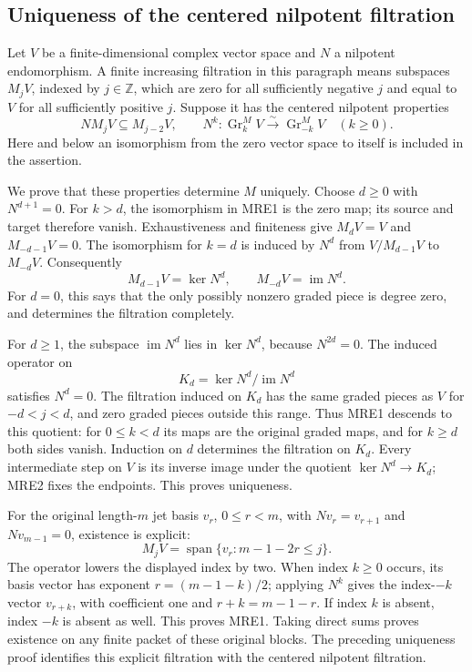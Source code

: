 \documentclass[11pt,a4paper]{article}
\begin{document}
\subsection{Uniqueness of the centered nilpotent filtration}

Let \(V\) be a finite-dimensional complex vector space and \(N\) a nilpotent
endomorphism. A finite increasing filtration in this paragraph means
subspaces \(M_jV\), indexed by \(j\in\mathbb Z\), which are zero for all
sufficiently negative \(j\) and equal to \(V\) for all sufficiently positive
\(j\). Suppose it has the centered nilpotent properties
\[
 NM_jV\subseteq M_{j-2}V,\qquad
 N^k:\operatorname{Gr}_k^M V\xrightarrow{\sim}
                    \operatorname{Gr}_{-k}^M V\quad(k\geq0).
 \tag{MRE1}
\]
Here and below an isomorphism from the zero vector space to itself is
included in the assertion.

We prove that these properties determine \(M\) uniquely. Choose \(d\geq0\)
with \(N^{d+1}=0\). For \(k>d\), the isomorphism in MRE1 is the zero map;
its source and target therefore vanish. Exhaustiveness and finiteness give
\(M_dV=V\) and \(M_{-d-1}V=0\). The isomorphism for \(k=d\) is induced by
\(N^d\) from \(V/M_{d-1}V\) to \(M_{-d}V\). Consequently
\[
 M_{d-1}V=\ker N^d,\qquad M_{-d}V=\operatorname{im}N^d.
 \tag{MRE2}
\]
For \(d=0\), this says that the only possibly nonzero graded piece is
degree zero, and determines the filtration completely.

For \(d\geq1\), the subspace \(\operatorname{im}N^d\) lies in
\(\ker N^d\), because \(N^{2d}=0\). The induced operator on
\[
 K_d=\ker N^d/\operatorname{im}N^d
 \tag{MRE3}
\]
satisfies \(N^d=0\). The filtration induced on \(K_d\) has the same graded
pieces as \(V\) for \(-d<j<d\), and zero graded pieces outside this range.
Thus MRE1 descends to this quotient: for \(0\leq k<d\) its maps are the
original graded maps, and for \(k\geq d\) both sides vanish. Induction on
\(d\) determines the filtration on \(K_d\). Every intermediate step on
\(V\) is its inverse image under the quotient
\(\ker N^d\longrightarrow K_d\); MRE2 fixes the endpoints. This proves
uniqueness.

For the original length-\(m\) jet basis \(v_r\), \(0\leq r<m\), with
\(Nv_r=v_{r+1}\) and \(Nv_{m-1}=0\), existence is explicit:
\[
 M_jV=\operatorname{span}\{v_r:m-1-2r\leq j\}.
 \tag{MRE4}
\]
The operator lowers the displayed index by two. When index \(k\geq0\)
occurs, its basis vector has exponent \(r=(m-1-k)/2\); applying \(N^k\)
gives the index-\(-k\) vector \(v_{r+k}\), with coefficient one and
\(r+k=m-1-r\). If index \(k\) is absent, index \(-k\) is absent as well.
This proves MRE1. Taking direct sums proves existence on any finite packet
of these original blocks. The preceding uniqueness proof identifies this
explicit filtration with the centered nilpotent filtration.
\end{document}
